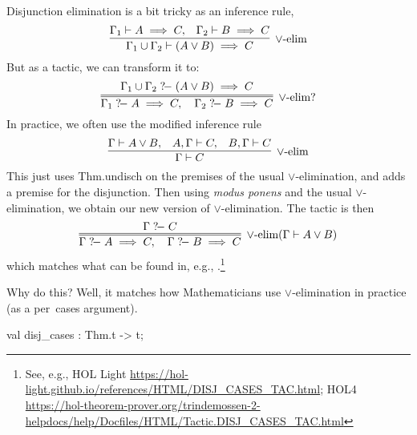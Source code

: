\begin{node}
Disjunction elimination is a bit tricky as an inference rule,
\begin{equation}
\vcenter{\infer[\lor\mbox{-elim}]{\Gamma_{1}\cup\Gamma_{2}\vdash(A\lor B)\implies C}{\Gamma_{1}\vdash A\implies C,&\Gamma_{2}\vdash B\implies C}}
\end{equation}
But as a tactic, we can transform it to:
\begin{equation}
\vcenter{\infer=[\lor\mbox{-elim}?]{\Gamma_{1}\gdash A\implies C,\quad\Gamma_{2}\gdash B\implies C}{\Gamma_{1}\cup\Gamma_{2}\gdash(A\lor B)\implies C}}
\end{equation}
In practice, we often use the modified inference rule
\begin{equation}
\vcenter{\infer[\lor\mbox{-elim}]{\Gamma\vdash C}{\Gamma\vdash A\lor B,&A,\Gamma\vdash C,&B,\Gamma\vdash C}}
\end{equation}
This just uses {\Tt{}Thm.undisch\nwendquote} on the premises of the usual
$\lor$-elimination, and adds a premise for the disjunction. Then using
\textit{modus ponens} and the usual $\lor$-elimination, we obtain our
new version of $\lor$-elimination. The tactic is then
\begin{equation}
\vcenter{\infer=[\lor\mbox{-elim}(\Gamma\vdash A\lor B)]{\Gamma\gdash A\implies C,\quad\Gamma\gdash B\implies C}{\Gamma\gdash C}}
\end{equation}
which matches what can be found in, e.g., \HOL.\footnote{See, e.g., HOL
Light \url{https://hol-light.github.io/references/HTML/DISJ_CASES_TAC.html};
HOL4 \url{https://hol-theorem-prover.org/trindemossen-2-helpdocs/help/Docfiles/HTML/Tactic.DISJ_CASES_TAC.html}}

Why do this? Well, it matches how Mathematicians use
$\lor$-elimination in practice (as a {\Tt{}per\ cases\nwendquote} argument).
\end{node}

\nwenddocs{}\plusendmoddef\nwstartdeflinemarkup{}\nwenddeflinemarkup
val disj_cases : Thm.t -> t;
\nwendcode{}\nwdocspar

